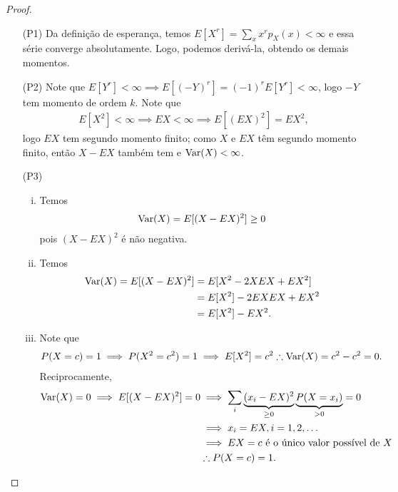 \documentclass[../Notas.tex]{subfiles}
\begin{document}
\begin{proof}
\begin{itemize}
    \item[(P1)] Da definição de esperança, temos $E[X^r] = \displaystyle{ \sum_x x^rp_X(x) < \infty }$ e essa série converge absolutamente. Logo, podemos derivá-la, obtendo os demais momentos.
    
    \item[(P2)] Note que $E[Y^r] < \infty \implies E[(-Y)^r] = (-1)^rE[Y^r] <\infty$, logo $-Y$ tem momento de ordem $k$. Note que
    \begin{align*}
        E[X^2] < \infty \implies EX < \infty \implies E[(EX)^2] = EX^2,
    \end{align*}
    logo $EX$ tem segundo momento finito; como $X$ e $EX$ têm segundo momento finito, então $X-EX$ também tem e $\text{Var}(X) < \infty$.
    
    \item[(P3)]\begin{enumerate}[(i)]
        \item Temos
        \begin{align*}
            \text{Var}(X) = E[(X-EX)^2] \geq 0
        \end{align*}
        pois $(X-EX)^2$ é não negativa.
        
        \item Temos
        \begin{align*}
            \text{Var}(X) = E[(X-EX)^2] &= E[X^2 - 2XEX + EX^2] \\
            &= E[X^2] - 2EXEX + EX^2 \\
            &= E[X^2] - EX^2.
        \end{align*}
        
        \item Note que
        \begin{align*}
            P(X=c) = 1 \implies P(X^2=c^2) = 1 \implies E[X^2] = c^2 \therefore \text{Var}(X) = c^2-c^2 = 0.
        \end{align*}
        Reciprocamente,
        \begin{align*}
            \text{Var}(X) = 0 \implies E[(X-EX)^2] = 0 &\implies \sum_i \underbrace{(x_i - EX)^2}_{\geq 0} \underbrace{P(X=x_i)}_{> 0} = 0 \\
            &\implies x_i = EX, i=1,2,\dots \\
            &\implies EX = c \text{ é o único valor possível de } X \\
            &\therefore P(X=c) = 1.
        \end{align*}
        

\end{enumerate}
\end{itemize}
\end{proof}
\end{document}
